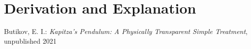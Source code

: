\documentclass[10pt,a4paper]{article}
\begin{document}
	
	\section{Derivation and Explanation} %
	
	
	\begin{thebibliography}{10}		
		Butikov, E. I.: 
		\textit{Kapitza’s Pendulum: A Physically Transparent Simple Treatment}, unpublished 2021
	\end{thebibliography}
\end{document}
